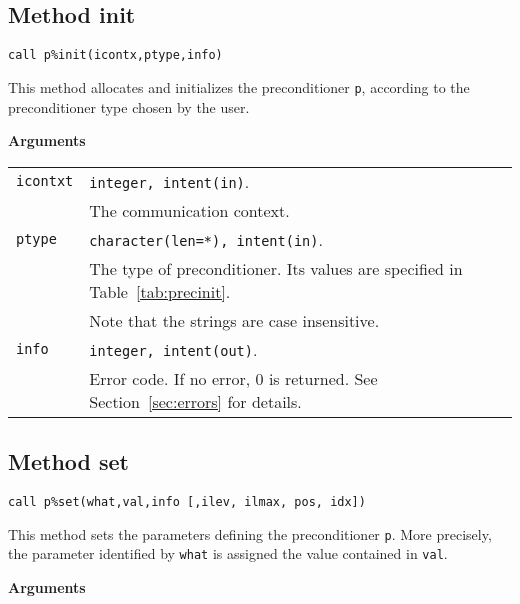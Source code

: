 \subsection{Method init\label{sec:precinit}}

\begin{center}
\verb|call p%init(icontx,ptype,info)|
\end{center}

\noindent
This method allocates and initializes the preconditioner
\verb|p|, according to the preconditioner type chosen by the user.

{\baselineskip\noindent\large\bfseries Arguments} \smallskip

\begin{tabular}{p{1.2cm}p{12cm}}

  \verb|icontxt| & \verb|integer, intent(in)|.\\
          &  The communication context.\\
\verb|ptype|  & \verb|character(len=*), intent(in)|.\\
              & The type of preconditioner. Its values are specified
              in Table~\ref{tab:precinit}.\\
              & Note that the strings are case insensitive.\\
\verb|info|   & \verb|integer, intent(out)|.\\
              & Error code. If no error, 0 is returned. See Section~\ref{sec:errors} for details.\\

\end{tabular}




\clearpage

\subsection{Method set\label{sec:precset}}

\begin{center}
\verb|call p%set(what,val,info [,ilev, ilmax, pos, idx])|
\end{center}

\noindent
This method sets the parameters defining the preconditioner \verb|p|. More
precisely, the parameter identified by \verb|what| is assigned the value
contained in \verb|val|.

{\baselineskip\noindent\large\bfseries Arguments} \smallskip

